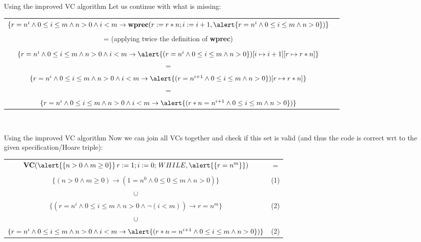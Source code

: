 \documentclass[aspectratio=169]{beamer}
\begin{document}
\begin{slide}{Using the improved VC algorithm}
Let us continue with what is missing:\\\vspace{0.5cm}
\small{
\begin{tabular}{cc}
 $\{r = n^i \land 0 \leq i \leq m \land n > 0 \land i < m \to \textbf{wprec}(r := r*n;i := i + 1, \alert{r = n^i \land 0 \leq i \leq m \land n > 0})\}$ \\
 \\
 = (applying twice the definition of \textbf{wprec})\\
 \\
 $\{r = n^i \land 0 \leq i \leq m \land n > 0 \land i < m \to \alert{(r = n^i \land 0 \leq i \leq m \land n > 0})[i \mapsto i + 1][r \mapsto r*n]\}$ \\
 =\\
 $\{r = n^i \land 0 \leq i \leq m \land n > 0 \land i < m \to \alert{(r = n^{i+1} \land 0 \leq i \leq m \land n > 0})[r \mapsto r*n]\}$\\
 =\\
 $\{r = n^i \land 0 \leq i \leq m \land n > 0 \land i < m \to \alert{(r*n = n^{i+1} \land 0 \leq i \leq m \land n > 0})\}$
\end{tabular}}\\\vspace{0.3cm}
\end{slide}

\begin{slide}{Using the improved VC algorithm}
Now we can join all VCs together and check if this set is valid (and thus the code is correct wrt to the given specification/Hoare triple):\\\vspace{0.5cm}
\small{
\begin{tabular}{cc}
$\textbf{VC}(\alert{\{n > 0 \land m \geq 0\}}\,r := 1;i := 0;\,WHILE,\alert{\{r = n^m\}})$  & =\\
\\
   $\{(n > 0 \land m \geq 0) \to (1 = n^0 \land 0 \leq 0 \leq m \land n > 0)\}$ & (1)\\
   $\cup$ \\
   $\{(r = n^i \land 0 \leq i \leq m \land n > 0 \land \neg(i < m)) \to r = n^m\}$ & (2)\\
   $\cup$ \\
   $\{r = n^i \land 0 \leq i \leq m \land n > 0 \land i < m \to \alert{(r*n = n^{i+1} \land 0 \leq i \leq m \land n > 0})\}$ & (2)
\end{tabular}}\\\vspace{0.3cm}
\end{slide}
\end{document}
